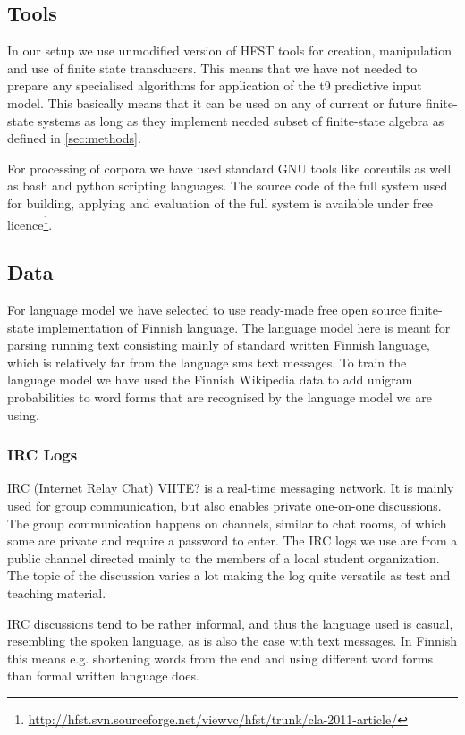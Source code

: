 \documentclass[a4paper,conference]{IEEEtran}
\begin{document}
\subsection{Tools}

In our setup we use unmodified version of HFST tools for creation, manipulation
and use of finite state transducers\cite{hfst/2011}. This means that we have
not needed to prepare any specialised algorithms for application of the t9
predictive input model. This basically means that it can be used on any of
current or future finite-state systems as long as they implement needed subset
of finite-state algebra as defined in \ref{sec:methods}.

For processing of corpora we have used standard GNU tools like coreutils as
well as bash and python scripting languages. The source code of the full system
used for building, applying and evaluation of the full system is available
under free
licence\footnote{\url{http://hfst.svn.sourceforge.net/viewvc/hfst/trunk/cla-2011-article/}}.

\subsection{Data}
\label{sec:data}

For language model we have selected to use ready-made free open source
finite-state implementation of Finnish language\cite{pirinen/2011/nodalida}.
The language model here is meant for parsing running text consisting mainly of
standard written Finnish language, which is relatively far from the language
sms text messages.  To train the language model we have used
the Finnish Wikipedia data to add unigram probabilities to word forms that are
recognised by the language model we are using. 

\subsubsection{IRC Logs}
IRC (Internet Relay Chat) VIITE? is a real-time messaging network. It is mainly used for group communication, but also enables private one-on-one discussions. The group communication happens on channels, similar to chat rooms, of which some are private and require a password to enter. The IRC logs we use are from a public channel directed mainly to the members of a local student organization. The topic of the discussion varies a lot making the log quite versatile as test and teaching material.

IRC discussions tend to be rather informal, and thus the language used is casual, resembling the spoken language, as is also the case with text messages. In Finnish this  means e.g. shortening words from the end and using different word forms than formal written language does.
\end{document}
